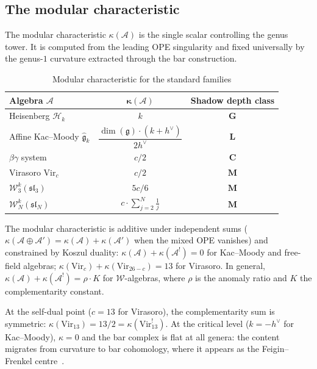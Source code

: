 \documentclass[11pt,reqno]{amsart}
\theoremstyle{definition}
\theoremstyle{remark}
\newcommand{\cA}{\mathcal{A}}
\newcommand{\cH}{\mathcal{H}}
\newcommand{\cW}{\mathcal{W}}
\newcommand{\fg}{\mathfrak{g}}
\newcommand{\Vir}{\mathrm{Vir}}
\numberwithin{equation}{section}
\begin{document}
\subsection{The modular characteristic}
\label{ssec:kappa}

The modular characteristic $\kappa(\cA)$ is the single
scalar controlling the genus tower. It is computed from
the leading OPE singularity and fixed universally by the
genus-$1$ curvature extracted through the bar construction.

\begin{table}[ht]
\centering
\caption{Modular characteristic for the standard families}
\label{tab:kappa}
\renewcommand{\arraystretch}{1.6}
\begin{tabular}{lcc}
\toprule
\textbf{Algebra $\cA$}
 & $\boldsymbol{\kappa(\cA)}$
 & \textbf{Shadow depth class} \\
\midrule
Heisenberg $\cH_k$
 & $k$
 & $\mathbf{G}$ \\
Affine Kac--Moody $\widehat{\fg}_k$
 & $\dfrac{\dim(\fg) \cdot (k + h^\vee)}{2h^\vee}$
 & $\mathbf{L}$ \\[4pt]
$\beta\gamma$ system
 & $c/2$
 & $\mathbf{C}$ \\
Virasoro $\Vir_c$
 & $c/2$
 & $\mathbf{M}$ \\
$\cW_3^k(\mathfrak{sl}_3)$
 & $5c/6$
 & $\mathbf{M}$ \\
$\cW_N^k(\mathfrak{sl}_N)$
 & $\displaystyle c \cdot \sum_{j=2}^{N}\frac{1}{j}$
 & $\mathbf{M}$ \\[4pt]
\bottomrule
\end{tabular}
\end{table}

The modular characteristic is additive under independent
sums ($\kappa(\cA \oplus \cA') = \kappa(\cA) + \kappa(\cA')$
when the mixed OPE vanishes) and constrained by Koszul
duality: $\kappa(\cA) + \kappa(\cA^!) = 0$ for
Kac--Moody and free-field algebras;
$\kappa(\Vir_c) + \kappa(\Vir_{26-c}) = 13$ for Virasoro.
In general, $\kappa(\cA) + \kappa(\cA^!) = \rho \cdot K$
for $\cW$-algebras, where $\rho$ is the
anomaly ratio and $K$ the complementarity constant.

At the self-dual point ($c = 13$ for Virasoro), the
complementarity sum is symmetric:
$\kappa(\Vir_{13}) = 13/2 = \kappa(\Vir_{13}^!)$.
At the critical level ($k = -h^\vee$ for Kac--Moody),
$\kappa = 0$ and the bar complex is flat at all genera:
the content migrates from curvature to bar cohomology,
where it appears as the Feigin--Frenkel centre~\cite{FF92}.
\end{document}
